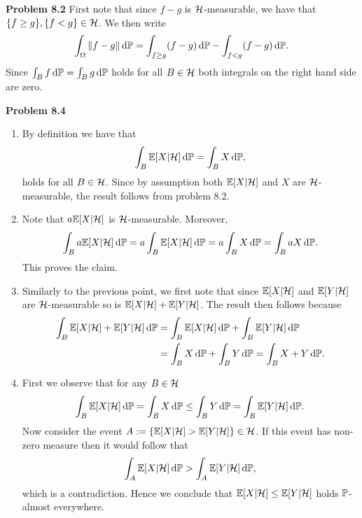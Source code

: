 
\textbf{Problem 8.2}
First note that since $f-g$ is $\mathcal H$-measurable, we have that $\{f \ge g\}, \{f < g\} \in \mathcal H$. We then write
\[
	\int_\Omega \|f-g\| \, \mathrm{d} \mathbb P = \int_{f \ge g} (f-g) \, \mathrm{d} \mathbb P - \int_{f < g} (f-g) \, \mathrm{d} \mathbb P.
\]
Since $\int_B f \, \mathrm{d} \mathbb P = \int_B g \, \mathrm{d} \mathbb P$ holds for all $B \in \mathcal H$ both integrals on the right hand side are zero. 

\bigskip
\textbf{Problem 8.4}

\begin{enumerate}[label={(\alph*)}]
\item By definition we have that
\[
	\int_B \mathbb E[X | \mathcal H] \, \mathrm{d} \mathbb P = \int_B X \, \mathrm{d} \mathbb P,
\]
holds for all $B \in \mathcal H$. Since by assumption both $\mathbb E[X | \mathcal H]$ and $X$ are $\mathcal H$-measurable, the result follows from problem 8.2.
\item Note that $a \mathbb E[X | \mathcal H]$ is $\mathcal H$-measurable. Moreover,
\[
	\int_B a \mathbb E[X | \mathcal H] \, \mathrm{d} \mathbb P = a \int_B \mathbb E[X | \mathcal H] \, \mathrm{d} \mathbb P = a \int_B X \, \mathrm{d} \mathbb P = \int_B aX \, \mathrm{d} \mathbb P.
\]
This proves the claim.
\item Similarly to the previous point, we first note that since $\mathbb E[X | \mathcal H]$ and $\mathbb E[Y | \mathcal H]$ are $\mathcal H$-measurable so is $\mathbb E[X | \mathcal H] + \mathbb E[Y | \mathcal H]$. The result then follows because
\begin{align*}
	\int_B \mathbb E[X | \mathcal H] + \mathbb E[Y | \mathcal H] \, \mathrm{d} \mathbb P 
	&= \int_B \mathbb E[X | \mathcal H] \, \mathrm{d} \mathbb P + \int_B \mathbb E[Y | \mathcal H] \, \mathrm{d} \mathbb P \\
	&= \int_B X \, \mathrm{d} \mathbb P + \int_B Y \, \mathrm{d} \mathbb P = \int_B X + Y \, \mathrm{d} \mathbb P.
\end{align*}
\item First we observe that for any $B \in \mathcal H$
\[
	\int_B \mathbb E[X | \mathcal H] \, \mathrm{d} \mathbb P = \int_B X \, \mathrm{d} \mathbb P \le \int_B Y \, \mathrm{d} \mathbb P = \int_B \mathbb E[Y | \mathcal H] \, \mathrm{d} \mathbb P.
\]
Now consider the event $A := \{ \mathbb E[X | \mathcal H] > \mathbb E[Y | \mathcal H]\} \in \mathcal H$. If this event has non-zero measure then it would follow that
\[
	\int_A \mathbb E[X | \mathcal H] \, \mathrm{d} \mathbb P > \int_A \mathbb E[Y | \mathcal H] \, \mathrm{d} \mathbb P,
\]
which is a contradiction. Hence we conclude that $\mathbb E[X | \mathcal H] \le \mathbb E[Y | \mathcal H]$ holds $\mathbb P$-almost everywhere.
\end{enumerate}
